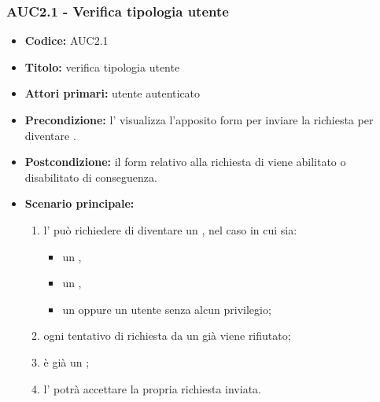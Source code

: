 \documentclass[casi-duso]{subfiles}
\begin{document}
\subsubsection{AUC2.1 - Verifica tipologia utente}
\label{subsub:AUC2.1}
\begin{itemize}
  \item \textbf{Codice:} AUC2.1
  \item \textbf{Titolo:} verifica tipologia utente
  \item \textbf{Attori primari:} utente autenticato
  \item \textbf{Precondizione:} l' visualizza l'apposito form per inviare la richiesta per diventare .
  \item \textbf{Postcondizione:} il form relativo alla richiesta di  viene abilitato o disabilitato di conseguenza.
  \item \textbf{Scenario principale:} 
  \begin{enumerate}
    \item l' può richiedere di diventare un , nel caso in cui sia:
    \begin{itemize}
      \item un ,
      \item un ,
      \item un  oppure un utente senza alcun privilegio;
    \end{itemize}
    \item ogni tentativo di richiesta da un già  viene rifiutato;
    \item {} è già un ;
    \item l' potrà accettare la propria richiesta inviata.
  \end{enumerate}
\end{itemize}
\end{document}
